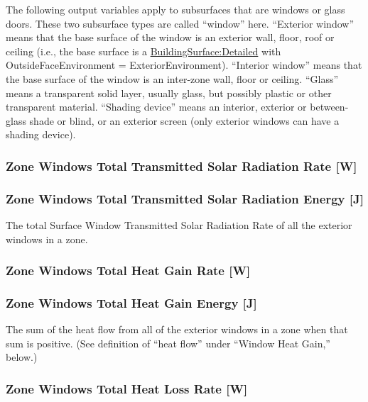 The following output variables apply to subsurfaces that are windows or glass doors. These two subsurface types are called ``window'' here. ``Exterior window'' means that the base surface of the window is an exterior wall, floor, roof or ceiling (i.e., the base surface is a \hyperref[buildingsurfacedetailed]{BuildingSurface:Detailed} with OutsideFaceEnvironment = ExteriorEnvironment). ``Interior window'' means that the base surface of the window is an inter-zone wall, floor or ceiling. ``Glass'' means a transparent solid layer, usually glass, but possibly plastic or other transparent material. ``Shading device'' means an interior, exterior or between-glass shade or blind, or an exterior screen (only exterior windows can have a shading device).

\subsubsection{Zone Windows Total Transmitted Solar Radiation Rate {[}W{]}}\label{zone-windows-total-transmitted-solar-radiation-rate-w}

\subsubsection{Zone Windows Total Transmitted Solar Radiation Energy {[}J{]}}\label{zone-windows-total-transmitted-solar-radiation-energy-j}

The total Surface Window Transmitted Solar Radiation Rate of all the exterior windows in a zone.

\subsubsection{Zone Windows Total Heat Gain Rate {[}W{]}}\label{zone-windows-total-heat-gain-rate-w}

\subsubsection{Zone Windows Total Heat Gain Energy {[}J{]}}\label{zone-windows-total-heat-gain-energy-j}

The sum of the heat flow from all of the exterior windows in a zone when that sum is positive. (See definition of ``heat flow'' under ``Window Heat Gain,'' below.)

\subsubsection{Zone Windows Total Heat Loss Rate {[}W{]}}\label{zone-windows-total-heat-loss-rate-w}

